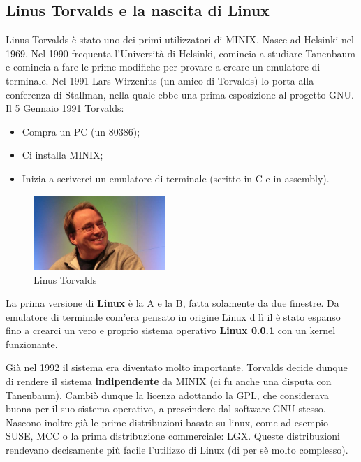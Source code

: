 \subsection{Linus Torvalds e la nascita di Linux}

Linus Torvalds è stato uno dei primi utilizzatori di MINIX. Nasce ad Helsinki nel 1969. Nel 1990 frequenta l'Università di Helsinki, comincia a studiare Tanenbaum e comincia a fare le prime modifiche per provare a creare un emulatore di terminale. Nel 1991 Lars Wirzenius (un amico di Torvalds) lo porta alla conferenza di Stallman, nella quale ebbe una prima esposizione al progetto GNU. Il 5 Gennaio 1991 Torvalds:

\begin{itemize}
	
	\item Compra un PC (un 80386);
	\item Ci installa MINIX;
	\item Inizia a scriverci un emulatore di terminale (scritto in C e in assembly).
	
\end{itemize}

\begin{figure}[htbp]
	\centering
	\includegraphics[width=50mm]{images/linus-torvalds.jpg}
	\caption{Linus Torvalds}
\end{figure}

La prima versione di \textbf{Linux} è la A e la B, fatta solamente da due finestre. Da emulatore di terminale com'era pensato in origine Linux d lì il è stato espanso fino a crearci un vero e proprio sistema operativo \textbf{Linux 0.0.1} con un kernel funzionante.

Già nel 1992 il sistema era diventato molto importante. Torvalds decide dunque di rendere il sistema \textbf{indipendente} da MINIX (ci fu anche una disputa con Tanenbaum). Cambiò dunque la licenza adottando la GPL, che considerava buona per il suo sistema operativo, a prescindere dal software GNU stesso. Nascono inoltre già le prime distribuzioni basate su linux, come ad esempio SUSE, MCC o la prima distribuzione commerciale: LGX. Queste distribuzioni rendevano decisamente più facile l'utilizzo di Linux (di per sè molto complesso).

